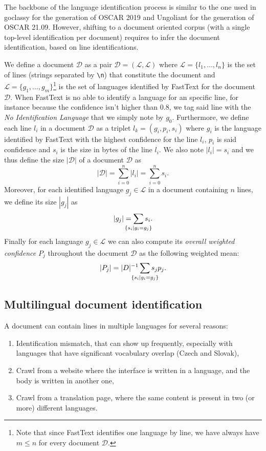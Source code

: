 The backbone of the language identification process is similar to the one used in goclassy \cite{ortiz-suarez-etal-2019-asynchronous} for the generation of OSCAR 2019 and Ungoliant \cite{abadji-etal-2021-ungoliant} for the generation of OSCAR 21.09. However, shifting to a document oriented corpus (with a single top-level identification per document) requires to infer the document identification, based on line identifications.


We define a document $\mathcal{D}$ as a pair $\mathcal{D}=(\mathcal{L}, \mathscr{L})$ where $\mathcal{L}=\{l_1,\ldots,l_n\}$ is the set of lines (strings separated by \texttt{\textbackslash n}) that constitute the document and $\mathscr{L} = \{g_1, \ldots, g_m\}$\footnote{Note that since FastText identifies one language by line, we have always have $m\le n$ for every document $\mathcal{D}$.} is the set of languages identified by FastText for the document $\mathcal{D}$. When FastText is no able to identify a language for an specific line, for instance because the confidence isn't higher than $0.8$, we tag said line with the \emph{No Identification Language} that we simply note by $g_0$. Furthermore, we define each line $l_i$ in a document $\mathcal{D}$ as a triplet $l_k=(g_i, p_i, s_i)$ where $g_i$ is the language identified by FastText with the highest confidence for the line $l_i$, $p_i$ is said confidence and $s_i$ is the size in bytes of the line $l_i$. We also note $|l_i|=s_i$ and we thus define the size $|\mathcal{D}|$ of a document $\mathcal{D}$ as
\[
    |\mathcal{D}| = \sum_{i=0}^{n} |l_i| = \sum_{i=0}^{n} s_i.
\]
Moreover, for each identified language $g_j \in \mathscr{L}$ in a document containing $n$ lines, we define its size $|g_j|$ as
\[
    |g_j| = \sum_{\mathclap{\{s_i \mid g_i = g_j\}}} s_i.
\]
Finally for each language $g_j \in \mathscr{L}$ we can also compute its \emph{overall weighted confidence} $P_j$ throughout the document $\mathcal{D}$ as the following weighted mean:
\[
    |P_j| = |D|^{-1}\sum_{\mathclap{\{s_i|g_i=g_j\}}} s_jp_j.
\]

\subsection{Multilingual document identification}

A document can contain lines in multiple languages for several reasons:
\begin{enumerate}
    \item Identification mismatch, that can show up frequently, especially with languages that have significant vocabulary overlap (Czech and Slovak),
    \item Crawl from a website where the interface is written in a language, and the body is written in another one,
    \item Crawl from a translation page, where the same content is present in two (or more) different languages.
\end{enumerate}

